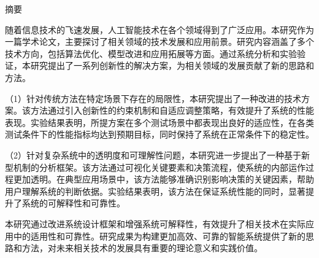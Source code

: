 {}
{}
\vspace*{-\dimexpr\headheight+\headsep\relax}
{\centering\heiti{} 摘\quad 要\par}
\vspace{0.5\baselineskip}
\noindent\hspace{2em}随着信息技术的飞速发展，人工智能技术在各个领域得到了广泛应用。本研究作为一篇学术论文，主要探讨了相关领域的技术发展和应用前景。研究内容涵盖了多个技术方向，包括算法优化、模型改进和应用拓展等方面。通过系统分析和实验验证，本研究提出了一系列创新性的解决方案，为相关领域的发展贡献了新的思路和方法。

（1）针对传统方法在特定场景下存在的局限性，本研究提出了一种改进的技术方案。该方法通过引入创新性的约束机制和自适应调整策略，有效提升了系统的性能表现。实验结果表明，所提方案在多个测试场景中都表现出良好的适应性，在各类测试条件下的性能指标均达到预期目标，同时保持了系统在正常条件下的稳定性。

（2）针对复杂系统中的透明度和可理解性问题，本研究进一步提出了一种基于新型机制的分析框架。该方法通过可视化关键要素和决策流程，使系统的内部运作过程更加透明。在典型应用场景中，该方法能够准确识别影响决策的关键因素，帮助用户理解系统的判断依据。实验结果表明，该方法在保证系统性能的同时，显著提升了系统的可解释性和可靠性。

本研究通过改进系统设计框架和增强系统可解释性，有效提升了相关技术在实际应用中的适用性和可靠性。研究成果为构建更加高效、可靠的智能系统提供了新的思路和方法，对未来相关技术的发展具有重要的理论意义和实践价值。

\vspace{0.5em}

\clearpage

